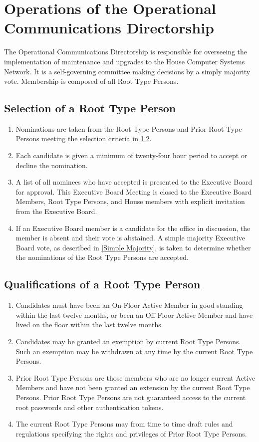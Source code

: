 \documentclass{article}
\newcommand{\bylaw}[1]{\section{#1} \label{#1}}
\newcommand{\bsection}[1]{\subsection{#1} \label{#1}}
\begin{document}
\bylaw{Operations of the Operational Communications Directorship}
The Operational Communications Directorship is responsible for overseeing the implementation of maintenance and upgrades to the House Computer Systems Network.
It  is a self-governing committee making decisions by a simply majority vote.
Membership is composed of all Root Type Persons.

\bsection{Selection of a Root Type Person}
\renewcommand{\theenumi}{\alph{enumi}} %
\begin{enumerate}
	\item Nominations are taken from the Root Type Persons and Prior Root Type Persons meeting the selection criteria in \ref{Qualifications of a Root Type Person}.
	\item Each candidate is given a minimum of twenty-four hour period to accept or decline the nomination.
	\item A list of all nominees who have accepted is presented to the Executive Board for approval. This Executive Board Meeting is closed to the Executive Board Members, Root Type Persons, and House members with explicit invitation from the Executive Board.
	\item If an Executive Board member is a candidate for the office in discussion, the member is absent and their vote is abstained.
		A simple majority Executive Board vote, as described in \ref{Simple Majority}, is taken to determine whether the nominations of the Root Type Persons are accepted.
\end{enumerate}

\bsection{Qualifications of a Root Type Person}
\renewcommand{\theenumi}{\alph{enumi}} %
\begin{enumerate}
	\item Candidates must have been an On-Floor Active Member in good standing within the last twelve months, or been an Off-Floor Active Member and have lived on the floor within the last twelve months.
	\item Candidates may be granted an exemption by current Root Type Persons. Such an exemption may be withdrawn at any time by the current Root Type Persons.
	\item Prior Root Type Persons are those members who are no longer current Active Members and have not been granted an extension by the current Root Type Persons.
		Prior Root Type Persons are not guaranteed access to the current root passwords and other authentication tokens.
	\item The current Root Type Persons may from time to time draft rules and regulations specifying the rights and privileges of Prior Root Type Persons.
\end{enumerate}
\end{document}
